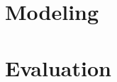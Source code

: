 \documentclass[sigconf]{acmart}
\begin{document}
\section{Modeling}


\section{Evaluation}





\appendix
\end{document}
